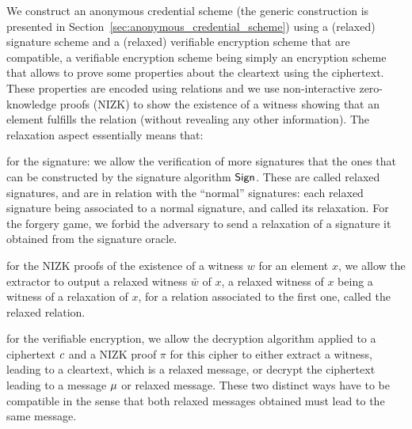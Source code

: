 We construct an anonymous credential scheme (the generic construction is 
presented in Section~\ref{sec:anonymous_credential_scheme}) using a 
(relaxed) signature scheme and a (relaxed) verifiable encryption scheme 
that are compatible, a verifiable encryption scheme being simply an 
encryption scheme that allows to prove some properties about the 
cleartext using the ciphertext. These properties are encoded using 
relations and we use non-interactive zero-knowledge proofs (NIZK) to 
show the existence of a witness showing that an element fulfills the 
relation (without revealing any other information).
The relaxation aspect essentially means that:
\begin{compactitem}

	\item for the signature: we allow the verification of more 
signatures that the ones that can be
	 constructed by the signature algorithm $\mathsf{Sign}$. These are 
called relaxed signatures, and are in relation with the
	 ``normal'' signatures: each relaxed signature being associated 
to a normal signature,
	 and called its relaxation.
	 For the forgery game, we forbid the adversary to send a 
relaxation of a signature it obtained from the signature oracle.

	\item for the NIZK proofs of the existence of a witness $w$ for
an element $x$, we allow the
		extractor to output a relaxed witness $\bar{w}$ of $x$, 
a relaxed witness of $x$
		being a witness of a relaxation of $x$, for a relation 
associated to the first one,
		called the relaxed relation.

	\item for the verifiable encryption, we allow the decryption 
algorithm applied to a
		ciphertext $c$ and a NIZK proof $\pi$ for this 
cipher to either extract a witness, leading to a cleartext, which is a 
relaxed message, or decrypt the ciphertext leading to a message $\mu$ 
or relaxed message. These two distinct ways have to be compatible in the 
sense that both relaxed messages obtained must lead to the same message.




\end{compactitem}

